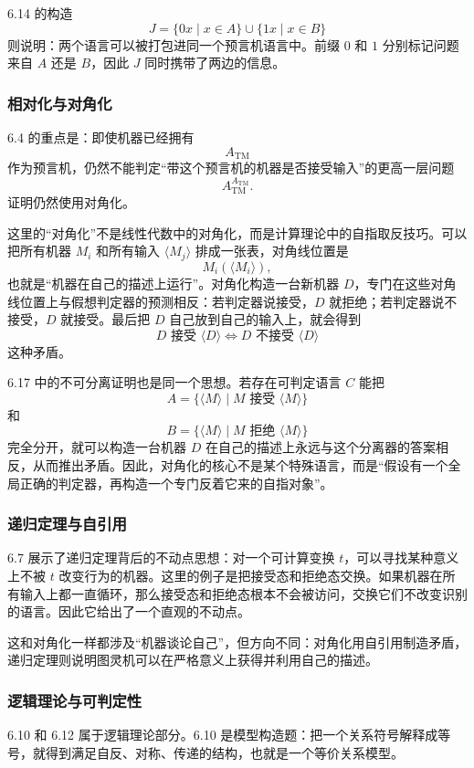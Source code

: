6.14 的构造
\[
J=\{0x\mid x\in A\}\cup\{1x\mid x\in B\}
\]
则说明：两个语言可以被打包进同一个预言机语言中。前缀 $0$ 和 $1$ 分别标记问题来自 $A$ 还是 $B$，因此 $J$ 同时携带了两边的信息。

\subsubsection*{相对化与对角化}

6.4 的重点是：即使机器已经拥有
\[
A_{\mathrm{TM}}
\]
作为预言机，仍然不能判定“带这个预言机的机器是否接受输入”的更高一层问题
\[
A_{\mathrm{TM}}^{A_{\mathrm{TM}}}.
\]
证明仍然使用对角化。

这里的“对角化”不是线性代数中的对角化，而是计算理论中的自指取反技巧。可以把所有机器 $M_i$ 和所有输入 $\langle M_j\rangle$ 排成一张表，对角线位置是
\[
M_i(\langle M_i\rangle),
\]
也就是“机器在自己的描述上运行”。对角化构造一台新机器 $D$，专门在这些对角线位置上与假想判定器的预测相反：若判定器说接受，$D$ 就拒绝；若判定器说不接受，$D$ 就接受。最后把 $D$ 自己放到自己的输入上，就会得到
\[
D \text{ 接受 } \langle D\rangle
\iff
D \text{ 不接受 } \langle D\rangle
\]
这种矛盾。

6.17 中的不可分离证明也是同一个思想。若存在可判定语言 $C$ 能把
\[
A=\{\langle M\rangle\mid M \text{ 接受 } \langle M\rangle\}
\]
和
\[
B=\{\langle M\rangle\mid M \text{ 拒绝 } \langle M\rangle\}
\]
完全分开，就可以构造一台机器 $D$ 在自己的描述上永远与这个分离器的答案相反，从而推出矛盾。因此，对角化的核心不是某个特殊语言，而是“假设有一个全局正确的判定器，再构造一个专门反着它来的自指对象”。

\subsubsection*{递归定理与自引用}

6.7 展示了递归定理背后的不动点思想：对一个可计算变换 $t$，可以寻找某种意义上不被 $t$ 改变行为的机器。这里的例子是把接受态和拒绝态交换。如果机器在所有输入上都一直循环，那么接受态和拒绝态根本不会被访问，交换它们不改变识别的语言。因此它给出了一个直观的不动点。

这和对角化一样都涉及“机器谈论自己”，但方向不同：对角化用自引用制造矛盾，递归定理则说明图灵机可以在严格意义上获得并利用自己的描述。

\subsubsection*{逻辑理论与可判定性}

6.10 和 6.12 属于逻辑理论部分。6.10 是模型构造题：把一个关系符号解释成等号，就得到满足自反、对称、传递的结构，也就是一个等价关系模型。

